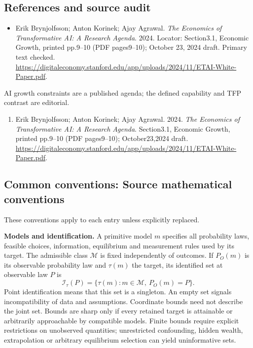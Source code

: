\documentclass[11pt,a4paper]{article}
\begin{document}
\subsection*{References and source audit}
\begin{itemize}
\item Erik Brynjolfsson; Anton Korinek; Ajay Agrawal. \emph{The Economics of Transformative AI: A Research Agenda}. 2024. Locator: Section3.1, Economic Growth, printed pp.9--10 (PDF pages9--10); October 23, 2024 draft. Primary text checked. \url{https://digitaleconomy.stanford.edu/app/uploads/2024/11/ETAI-White-Paper.pdf}.
\end{itemize}
AI growth constraints are a published agenda; the defined capability and TFP contrast are editorial.
\begin{enumerate}\raggedright
\item\hypertarget{definitions:source:30007544:1}{} Erik Brynjolfsson; Anton Korinek; Ajay Agrawal. 2024. \emph{The Economics of Transformative AI: A Research Agenda}. Section3.1, Economic Growth, printed pp.9--10 (PDF pages9--10); October23,2024 draft.
\url{https://digitaleconomy.stanford.edu/app/uploads/2024/11/ETAI-White-Paper.pdf}.
\end{enumerate}

\subsection*{Common conventions: Source mathematical conventions}

These conventions apply to each entry unless explicitly replaced.

\textbf{Models and identification.} A primitive model \(m\) specifies all probability laws, feasible choices, information, equilibrium and measurement rules used by its target. The admissible class \(\mathcal M\) is fixed independently of outcomes. If \(P_O(m)\) is its observable probability law and \(\tau(m)\) the target, its identified set at observable law \(P\) is
\[
 \mathcal I_\tau(P)=\{\tau(m):m\in\mathcal M,\ P_O(m)=P\}.
\]
Point identification means that this set is a singleton. An empty set signals incompatibility of data and assumptions. Coordinate bounds need not describe the joint set. Bounds are sharp only if every retained target is attainable or arbitrarily approachable by compatible models. Finite bounds require explicit restrictions on unobserved quantities; unrestricted confounding, hidden wealth, extrapolation or arbitrary equilibrium selection can yield uninformative sets.
\end{document}
